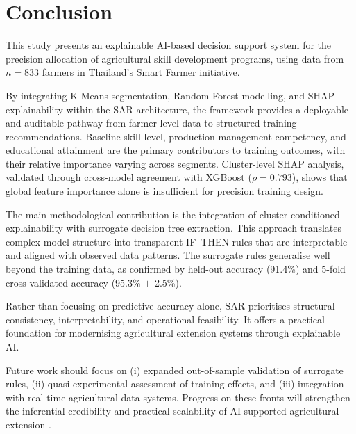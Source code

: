 \documentclass[3p,twocolumn,authoryear]{elsarticle}
\begin{document}
\section{Conclusion}

This study presents an explainable AI-based decision support system for the
precision allocation of agricultural skill development programs, using data from
$n = 833$ farmers in Thailand's Smart Farmer initiative.

By integrating K-Means segmentation, Random Forest modelling, and SHAP
explainability within the SAR architecture, the framework provides a deployable
and auditable pathway from farmer-level data to structured training
recommendations. Baseline skill level, production management competency, and
educational attainment are the primary contributors to training outcomes, with
their relative importance varying across segments. Cluster-level SHAP analysis,
validated through cross-model agreement with XGBoost ($\rho = 0.793$), shows
that global feature importance alone is insufficient for precision training
design.

The main methodological contribution is the integration of cluster-conditioned
explainability with surrogate decision tree extraction. This approach translates
complex model structure into transparent IF--THEN rules that are interpretable
and aligned with observed data patterns. The surrogate rules generalise well
beyond the training data, as confirmed by held-out accuracy (91.4\%) and 5-fold
cross-validated accuracy (95.3\% $\pm$ 2.5\%).

Rather than focusing on predictive accuracy alone, SAR prioritises structural
consistency, interpretability, and operational feasibility. It offers a
practical foundation for modernising agricultural extension systems through
explainable AI.

Future work should focus on (i) expanded out-of-sample validation of surrogate
rules, (ii) quasi-experimental assessment of training effects, and (iii)
integration with real-time agricultural data systems. Progress on these fronts
will strengthen the inferential credibility and practical scalability of
AI-supported agricultural extension \citep{yang2025,zhang2026}.


\end{document}
